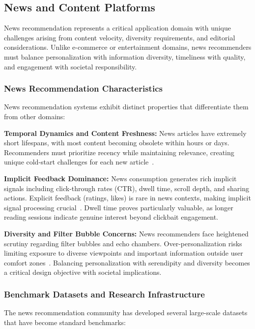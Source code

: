 \subsection{News and Content Platforms}

News recommendation represents a critical application domain with unique challenges arising from content velocity, diversity requirements, and editorial considerations. Unlike e-commerce or entertainment domains, news recommenders must balance personalization with information diversity, timeliness with quality, and engagement with societal responsibility.

\subsubsection{News Recommendation Characteristics}

News recommendation systems exhibit distinct properties that differentiate them from other domains:

\textbf{Temporal Dynamics and Content Freshness:} News articles have extremely short lifespans, with most content becoming obsolete within hours or days. Recommenders must prioritize recency while maintaining relevance, creating unique cold-start challenges for each new article~\cite{liu2010personalized}.

\textbf{Implicit Feedback Dominance:} News consumption generates rich implicit signals including click-through rates (CTR), dwell time, scroll depth, and sharing actions. Explicit feedback (ratings, likes) is rare in news contexts, making implicit signal processing crucial~\cite{okura2017embedding}. Dwell time proves particularly valuable, as longer reading sessions indicate genuine interest beyond clickbait engagement.

\textbf{Diversity and Filter Bubble Concerns:} News recommenders face heightened scrutiny regarding filter bubbles and echo chambers. Over-personalization risks limiting exposure to diverse viewpoints and important information outside user comfort zones~\cite{wu2019neural}. Balancing personalization with serendipity and diversity becomes a critical design objective with societal implications.

\subsubsection{Benchmark Datasets and Research Infrastructure}

The news recommendation community has developed several large-scale datasets that have become standard benchmarks:


